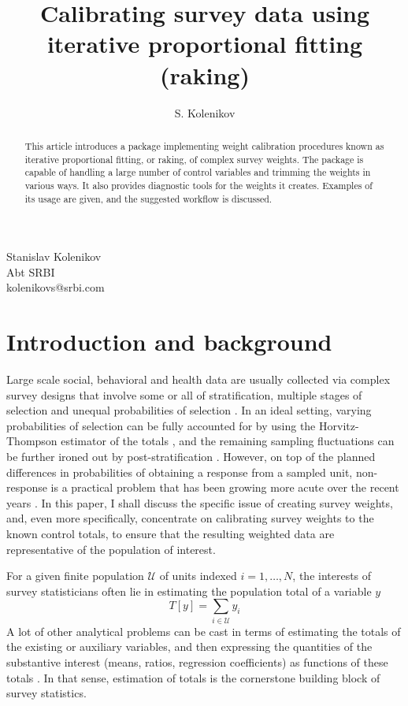 \author{S. Kolenikov}{%
  Stanislav Kolenikov\\Abt SRBI\\kolenikovs@srbi.com
}
\title[Raking survey data]{Calibrating survey data using iterative proportional fitting (raking)}
\maketitle

\begin{abstract}
This article introduces a package implementing weight calibration
procedures known as iterative proportional fitting,
or raking, of complex survey weights.
The package is capable of handling a large number of control
variables and trimming the weights in various ways.
It also provides diagnostic tools for the weights it creates.
Examples of its usage are given,
and the suggested workflow is discussed.

\end{abstract}

\section{Introduction and background}

Large scale social, behavioral and health data are usually collected
via complex survey designs that involve some or all of stratification,
multiple stages of selection and unequal probabilities of selection
\citep{korn:graubard:1995,korn:graubard:1999}.
In an ideal setting, varying probabilities of selection can be fully
accounted for by using the Horvitz-Thompson estimator of the totals
\citep{horvitz:thompson:1952,thompson:1997}, and the remaining
sampling fluctuations can be further ironed out by
post-stratification \citep{holt:smith:1979}.
However, on top of the planned differences in probabilities of obtaining
a response from a sampled unit, non-response is a practical problem
that has been growing more acute over the recent years
\citep{groves:dillman:eltinge:little:2001,pew:2012}.
In this paper, I shall discuss the specific issue of creating
survey weights, and, even more specifically, concentrate on
calibrating survey weights to the known control totals, to ensure
that the resulting weighted data are representative of the population
of interest.

For a given finite population $\mathcal U$ of units indexed $i=1,\ldots,N$,
the interests of survey statisticians often lie in estimating the
population total of a variable $y$
\begin{equation}
   T[y] = \sum_{i \in \mathcal{U}} y_i
   \label{eq:total:pop}
\end{equation}
A lot of other analytical problems can be cast in terms of estimating
the totals of the existing or auxiliary variables, and then expressing
the quantities of the substantive interest (means, ratios, regression
coefficients) as functions of these totals \citep{skinner:1989}. In that
sense, estimation of totals is the cornerstone building block of survey
statistics.

